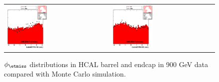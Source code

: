 \begin{figure}[h!]
 \centering
 \begin{tabular}{ll}
  \includegraphics[width=0.40\textwidth]{plots_DataVsMC_MB_900GeV/my_calometHBPhi.eps} &
  \includegraphics[width=0.40\textwidth]{plots_DataVsMC_MB_900GeV/my_calometHEPhi.eps} \\
 \end{tabular}
 \caption{$\phi_{\etmiss}$ distributions in HCAL barrel and endcap in 900 GeV data compared
   with Monte Carlo simulation.
          \label{fig:DataVsMC_MB_900_9}}
\end{figure}

